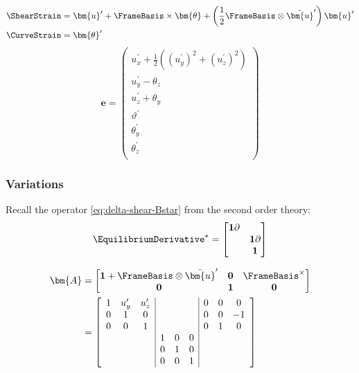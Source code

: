 
\begin{equation}
\begin{aligned}
\ShearStrain &= \bm{u}^{\prime} + \FrameBasis\times\bm{\theta} + \left(\frac{1}{2}\FrameBasis\otimes\bar{\bm{u}}^{\prime}\right)\bm{u}^{\prime} \\
\CurveStrain &= \bm{\theta}^{\prime}
\end{aligned}
\label{eq:axial-shear-strain}
\end{equation}
\begin{equation}
\bm{e} =
\begin{pmatrix}
u_x^{\prime} + \frac{1}{2}\left((u_y^{\prime})^2 + (u_z^{\prime})^2\right) \\ 
\left.u_y^{\prime}-\theta_z\right. \\ %
\left.u_z^{\prime}+\theta_y\right. \\ %
\hline
\vartheta^{\prime} \\ 
\theta_y^{\prime} \\
\theta_z^{\prime} \\
\end{pmatrix}
\end{equation}

\subsubsection{Variations}

Recall the operator \eqref{eq:delta-shear-Bstar} from the second order  theory:
\begin{equation*}
\EquilibriumDerivative^* = \begin{bmatrix}
\mathbf{1} \partial & \\
 & \mathbf{1} \partial  \\
& \mathbf{1}
\end{bmatrix}
\end{equation*}

$$
\begin{aligned}
\bm{A} &= \begin{bmatrix}
\mathbf{1} + \FrameBasis \otimes \bar{\bm{u}}^{\prime} & \mathbf{0} & \FrameBasis^{\times} \\
\mathbf{0} & \mathbf{1} & \mathbf{0}
\end{bmatrix} \\
&= \left[\begin{array}{ccc|ccc|ccc}
1 & u_y^{\prime} & u_z^{\prime} & & & & 0 & 0 &  0 \\
0 &            1 &            0 & & & & 0 & 0 & -1 \\
0 &            0 &            1 & & & & 0 & 1 &  0 \\
& & & 1 & 0 & 0 \\
& & & 0 & 1 & 0 \\
& & & 0 & 0 & 1
\end{array}
\right]
\end{aligned}
$$


